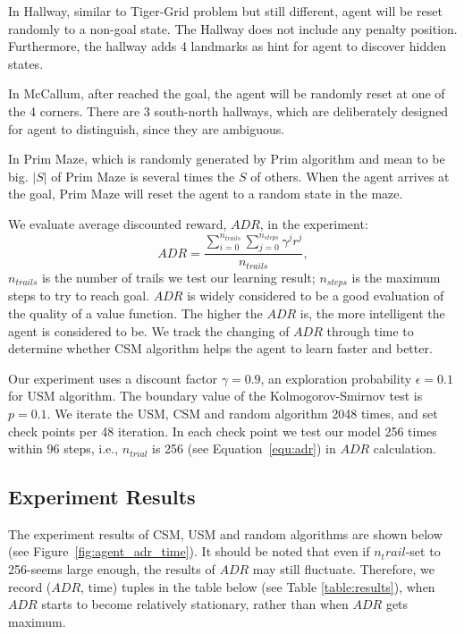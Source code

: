 \documentclass[conference]{IEEEtran}
\begin{document}
	In Hallway, similar to Tiger-Grid problem but still different, agent will be reset randomly
	to a non-goal state. The Hallway does not include any penalty position. Furthermore, the hallway
	adds 4 landmarks as hint for agent to discover hidden states.
	
	In McCallum, after reached the goal, the agent will be randomly reset at one of the 4 corners.
	There are 3 south-north hallways, which are deliberately designed for agent to distinguish, since
	they are ambiguous. 
	
	In Prim Maze, which is randomly generated by Prim algorithm and mean to be big. $|S|$ of Prim Maze
	is several times the $S$ of others. When the agent arrives at the goal, Prim Maze will reset
	the agent to a random state in the maze.
	
	We evaluate average discounted reward, $ADR$, in the experiment:
	\begin{equation}
	ADR = \frac{\sum_{i=0}^{n_{trails}} \sum_{j=0}^{n_{steps}} \gamma^j r^j}{n_{trails}}, \label{equ:adr}
	\end{equation}
	$n_{trails}$ is the number of trails we test our learning result; $n_{steps}$ is the maximum
	steps to try to reach goal. $ADR$ is widely considered to be a good evaluation of the quality of
	a value function. The higher the $ADR$ is, the more intelligent the agent is considered to be.
	We track the changing of $ADR$ through time to determine whether CSM algorithm helps the agent to learn
	faster and better.
	
	Our experiment uses a discount factor $\gamma=0.9$, an exploration probability $\epsilon=0.1$ for USM algorithm.
	The boundary value of the Kolmogorov-Smirnov test is $p=0.1$. We iterate the USM, CSM and random algorithm
	2048 times, and set check points per 48 iteration. In each check point we test our model 256 times
	within 96 steps, i.e., $n_{trial}$ is 256 (see Equation~\ref{equ:adr}) in $ADR$ calculation.
	
	\subsection{Experiment Results}
	
	The experiment results of CSM, USM and random algorithms are shown below (see Figure~\ref{fig:agent_adr_time}).
	It should be noted that even if $n_trail$-set to 256-seems large enough, the results of $ADR$ may still fluctuate.
	Therefore, we record ($ADR$, time) tuples in the table below (see Table \ref{table:results}), when $ADR$ starts
	to become relatively stationary, rather than when $ADR$ gets maximum. 
	
\end{document}
